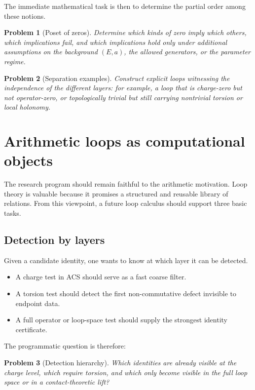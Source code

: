 \documentclass[11pt]{article}
\newtheorem{problem}{Problem}[section]
\newcommand{\ACS}{ACS}
\begin{document}
The immediate mathematical task is then to determine the partial order among these notions.

\begin{problem}[Poset of zeros]
Determine which kinds of zero imply which others, which implications fail, and which implications hold only under additional assumptions on the background $(E,a)$, the allowed generators, or the parameter regime.
\end{problem}

\begin{problem}[Separation examples]
Construct explicit loops witnessing the independence of the different layers: for example, a loop that is charge-zero but not operator-zero, or topologically trivial but still carrying nontrivial torsion or local holonomy.
\end{problem}

\section{Arithmetic loops as computational objects}

The research program should remain faithful to the arithmetic motivation. Loop theory is valuable because it promises a structured and reusable library of relations. From this viewpoint, a future loop calculus should support three basic tasks.

\subsection{Detection by layers}

Given a candidate identity, one wants to know at which layer it can be detected.
\begin{itemize}
\item A charge test in \ACS{} should serve as a fast coarse filter.
\item A torsion test should detect the first non-commutative defect invisible to endpoint data.
\item A full operator or loop-space test should supply the strongest identity certificate.
\end{itemize}
The programmatic question is therefore:

\begin{problem}[Detection hierarchy]
Which identities are already visible at the charge level, which require torsion, and which only become visible in the full loop space or in a contact-theoretic lift?
\end{problem}
\end{document}
